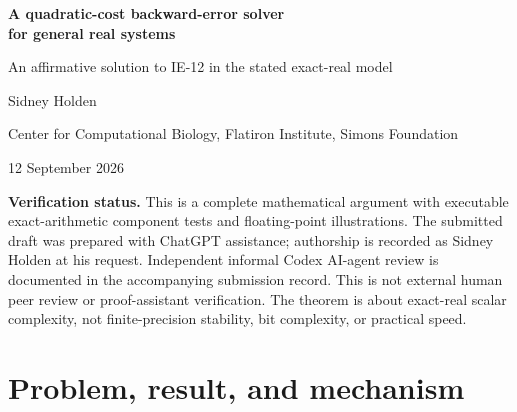 \documentclass[11pt,a4paper]{article}
\theoremstyle{remark}
\newcommand{\eps}{\varepsilon}
\newcommand{\norm}[1]{\left\|#1\right\|_2}
\begin{document}
\thispagestyle{plain}
\begin{center}
{\color{inkblue}\Large\bfseries A quadratic-cost backward-error solver\\[4pt]
for general real systems}\par
\vspace{7pt}
{\large An affirmative solution to IE-12 in the stated exact-real model}\par
\vspace{9pt}
{\large Sidney Holden}\par
{\small Center for Computational Biology, Flatiron Institute, Simons Foundation}\par
{12 September 2026}
\end{center}

\begin{abstract}
We give an explicit randomized algorithm for the normalized, fully accessible
real linear-system problem in IE-12. Its deterministic worst-case operation
count is $O(n^2\eps^{-3})$; with probability greater than $0.997$ its nonzero
output satisfies $\norm{Ax-b}/\norm{x}\le 5\eps/8$. Thus the answer to IE-12
is affirmative with $q=3$. The algorithm rounds $A$ once to a nearby scaled
integer matrix. A weighted-pattern multiplication scheme supports repeated
products with this matrix and its transpose more cheaply than dense products.
A rectangular augmented system supplies an exact kernel, and a fixed-length
randomly started polynomial filter finds an approximate kernel vector.
A clamping step converts it to the required backward-error guarantee without
perturbing $b$. The logarithm in the iteration count is canceled by the
preprocessed product cost, not removed from convergence itself. All essential
lemmas, probability estimates, model details, and cost bounds are proved below.
\end{abstract}

\noindent\textbf{Verification status.} This is a complete mathematical argument
with executable exact-arithmetic component tests and floating-point
illustrations. The submitted draft was prepared with ChatGPT assistance;
authorship is recorded as Sidney Holden at his request. Independent informal
Codex AI-agent review is documented in the accompanying submission record.
This is not external human peer review or proof-assistant verification. The theorem is about exact-real scalar complexity, not
finite-precision stability, bit complexity, or practical speed.

\section{Problem, result, and mechanism}
\end{document}
